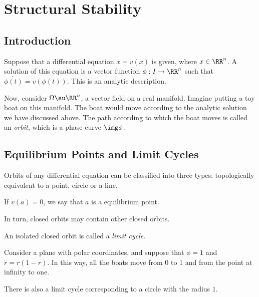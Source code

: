 \documentclass[11pt]{scrartcl}
\begin{document}
  \section{Structural Stability}

  \subsection{Introduction}

  Suppose that a differential equation $\dot{x} = v(x)$ is given,
  where $x\in \RR^{n}$. A solution of this equation is a vector
  function $\phi: I \to \RR^{n}$ such that
  $\dot{\phi(t)} = v(\phi(t))$. This is an analytic description.

  Now, consider $\Omega \su \RR^{n}$, a vector field on a real
  manifold. Imagine putting a toy boat on this manifold. The boat
  would move according to the analytic solution we have discussed
  above. The path according to which the boat moves is called an
  \textit{orbit}, which is a phase curve $\img \phi$.

  \subsection{Equilibrium Points and Limit Cycles}

  Orbits of any differential equation can be classified into three
  types: topologically equivalent to a point, circle or a line.

  \begin{definition}
    If $v(a) = 0$, we say that $a$ is a equilibrium point.
  \end{definition}

  In turn, closed orbits may contain other closed orbits.

  \begin{definition}
    An isolated closed orbit is called a \textit{limit cycle}.
  \end{definition}

  \begin{example}

    Consider a plane with polar coordinates, and suppose that
    $\dot{\phi} = 1$ and $\dot{r} = r(1-r)$. In this way, all the
    boats move from $0$ to $1$ and from the point at infinity to one.

    There is also a limit cycle corresponding to a circle with the
    radius $1$.

  \end{example}
\end{document}
